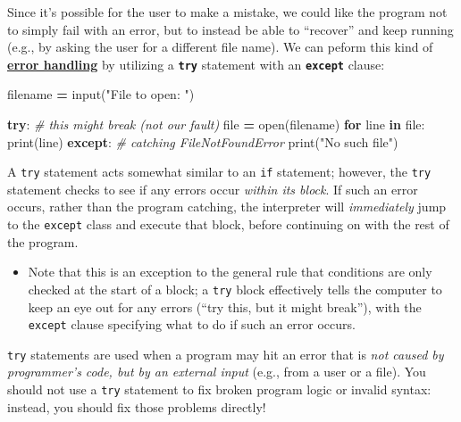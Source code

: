 \documentclass[]{book}
\newenvironment{Shaded}{\begin{snugshade}}{\end{snugshade}}
\newcommand{\KeywordTok}[1]{\textcolor[rgb]{0.13,0.29,0.53}{\textbf{#1}}}
\newcommand{\StringTok}[1]{\textcolor[rgb]{0.31,0.60,0.02}{#1}}
\newcommand{\CommentTok}[1]{\textcolor[rgb]{0.56,0.35,0.01}{\textit{#1}}}
\newcommand{\ControlFlowTok}[1]{\textcolor[rgb]{0.13,0.29,0.53}{\textbf{#1}}}
\newcommand{\OperatorTok}[1]{\textcolor[rgb]{0.81,0.36,0.00}{\textbf{#1}}}
\newcommand{\BuiltInTok}[1]{#1}
\newcommand{\NormalTok}[1]{#1}
\providecommand{\tightlist}{%
  \setlength{\itemsep}{0pt}\setlength{\parskip}{0pt}}
\begin{document}
Since it's possible for the user to make a mistake, we could like the
program not to simply fail with an error, but to instead be able to
``recover'' and keep running (e.g., by asking the user for a different
file name). We can peform this kind of
\href{https://docs.python.org/3/tutorial/errors.html}{\textbf{error
handling}} by utilizing a \textbf{\texttt{try}} statement with an
\textbf{\texttt{except}} clause:

\begin{Shaded}
\begin{Highlighting}[]
\NormalTok{filename }\OperatorTok{=} \BuiltInTok{input}\NormalTok{(}\StringTok{"File to open: "}\NormalTok{)}

\ControlFlowTok{try}\NormalTok{: }\CommentTok{# this might break (not our fault)}
    \BuiltInTok{file} \OperatorTok{=} \BuiltInTok{open}\NormalTok{(filename)}
    \ControlFlowTok{for}\NormalTok{ line }\KeywordTok{in} \BuiltInTok{file}\NormalTok{:}
        \BuiltInTok{print}\NormalTok{(line)}
\ControlFlowTok{except}\NormalTok{:  }\CommentTok{# catching FileNotFoundError}
    \BuiltInTok{print}\NormalTok{(}\StringTok{"No such file"}\NormalTok{)}
\end{Highlighting}
\end{Shaded}

A \texttt{try} statement acts somewhat similar to an \texttt{if}
statement; however, the \texttt{try} statement checks to see if any
errors occur \emph{within its block}. If such an error occurs, rather
than the program catching, the interpreter will \emph{immediately} jump
to the \texttt{except} class and execute that block, before continuing
on with the rest of the program.

\begin{itemize}
\tightlist
\item
  Note that this is an exception to the general rule that conditions are
  only checked at the start of a block; a \texttt{try} block effectively
  tells the computer to keep an eye out for any errors (``try this, but
  it might break''), with the \texttt{except} clause specifying what to
  do if such an error occurs.
\end{itemize}

\texttt{try} statements are used when a program may hit an error that is
\emph{not caused by programmer's code, but by an external input} (e.g.,
from a user or a file). You should not use a \texttt{try} statement to
fix broken program logic or invalid syntax: instead, you should fix
those problems directly!
\end{document}
